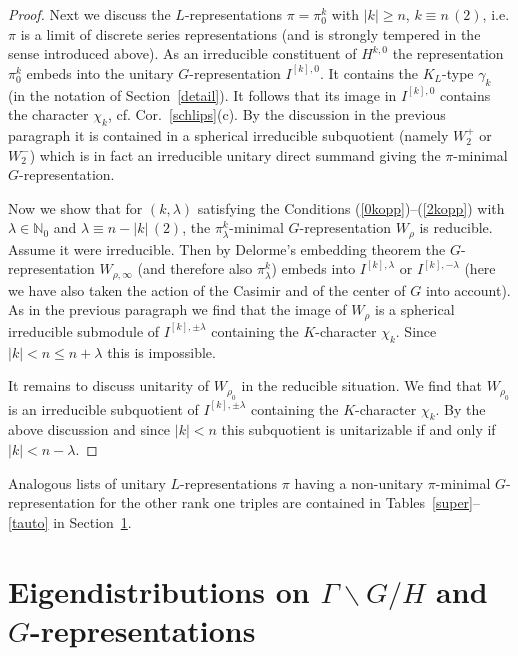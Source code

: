 \documentclass[10]{amsart}
\theoremstyle{remark}
\theoremstyle{definition}
\numberwithin{equation}{section}
\newcommand{\N}{\mathbb{N}}           %
\begin{document}
{\begin{proof}
Next we discuss the $L$-representations $\pi=\pi^k_0$
with $|k|\ge n$, $k\equiv n\, (2)$, i.e. $\pi$ is a limit of discrete series representations (and is strongly tempered in the sense introduced above). As an irreducible constituent of $H^{k,0}$
the representation $\pi^k_0$ embeds into the unitary $G$-representation $I^{[k],0}$. It contains the $K_L$-type $\gamma_k$ (in the notation of Section~\ref{detail}). It follows that its image in $I^{[k],0}$ contains the character
$\chi_k$, cf. Cor.~\ref{schlips}(c). By the discussion in the previous paragraph it is contained in a spherical irreducible subquotient (namely $W_2^+$ or $W_2^-$) which is in fact an irreducible unitary direct summand giving the $\pi$-minimal $G$-representation. 

Now we show that for $(k,\lambda)$ satisfying the Conditions (\ref{0kopp})--(\ref{2kopp})  with $\lambda\in\N_0$ and 
$\lambda\equiv n-|k| \, (2)$, 
the $\pi^k_\lambda$-minimal $G$-representation $W_\rho$ is reducible. Assume it were irreducible. Then by Delorme's embedding theorem the $G$-representation $W_{\rho,\infty}$ (and therefore also $\pi^k_\lambda$) embeds into $I^{[k],\lambda}$ or  $I^{[k],-\lambda}$ 
(here we have also taken the action of the Casimir and of the center of $G$ into account). As in the previous paragraph we find that the image of $W_\rho$ is a spherical irreducible submodule of $I^{[k],\pm\lambda}$ containing the $K$-character $\chi_k$. Since $|k|<n\le n+\lambda$ this is impossible.

It remains to discuss unitarity of $W_{\rho_0}$ in the reducible situation. We find that $W_{\rho_0}$ is an irreducible subquotient of  $I^{[k],\pm\lambda}$ containing the $K$-character $\chi_k$.
By the above discussion and since $|k|<n$  this subquotient is unitarizable if and only if $|k|<n-\lambda$.
\end{proof}

Analogous lists of unitary $L$-representations $\pi$ having a non-unitary $\pi$-minimal $G$-representation for the other rank one triples are contained in Tables~\ref{super}--\ref{tauto} 
in Section~\ref{eigen}.


\section{Eigendistributions on $\Gamma\backslash G/H$ and $G$-representations}\label{eigen}

}
\end{document}
